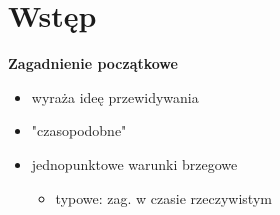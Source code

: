 \section{Wstęp}
\begin{frame}
	\begin{flushleft}
		\textbf{Zagadnienie początkowe}
		\begin{itemize}
          \item wyraża ideę przewidywania
          \item "czasopodobne"
          \item jednopunktowe warunki brzegowe
              \begin{itemize}
              	\item typowe: zag. w czasie rzeczywistym
              \end{itemize}
		\end{itemize}
	\end{flushleft}
\end{frame}

